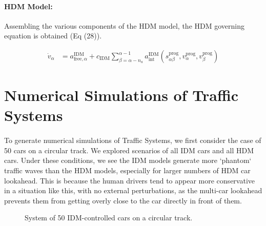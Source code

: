 \documentclass[12pt]{article}
\begin{document}
\paragraph{HDM Model:}
Assembling the various components of the HDM model, the HDM governing equation is obtained (Eq (28)).
\begin{mymathbox}[ams gather, title=HDM Governing Equation,colframe=blue!30!black]
  \begin{align}
\dot v_\alpha &= a_{\text{free},\alpha}^{\text{IDM}}+c_{\text{IDM}}\sum_{\beta=\alpha-n_a}^{\alpha-1}a_{\text{int}}^{\text{IDM}}(s^{\text{prog}}_{\alpha\beta},v^{\text{prog}}_\alpha,v^{\text{prog}}_\beta)
  \end{align}
\end{mymathbox}
\section{Numerical Simulations of Traffic Systems}

\paragraph{}To generate numerical simulations of Traffic Systems, we first consider the case of 50 cars on a circular track. We explored scenarios of all IDM cars and all HDM cars. Under these conditions, we see the IDM models generate more `phantom` traffic waves than the HDM models, especially for larger numbers of HDM car lookahead. This is because the human drivers tend to appear more conservative in a situation like this, with no external perturbations, as the multi-car lookahead prevents them from getting overly close to the car directly in front of them.

\begin{figure}[H]
  \centering
  \caption{System of 50 IDM-controlled cars on a circular track.}
\end{figure}
\end{document}
